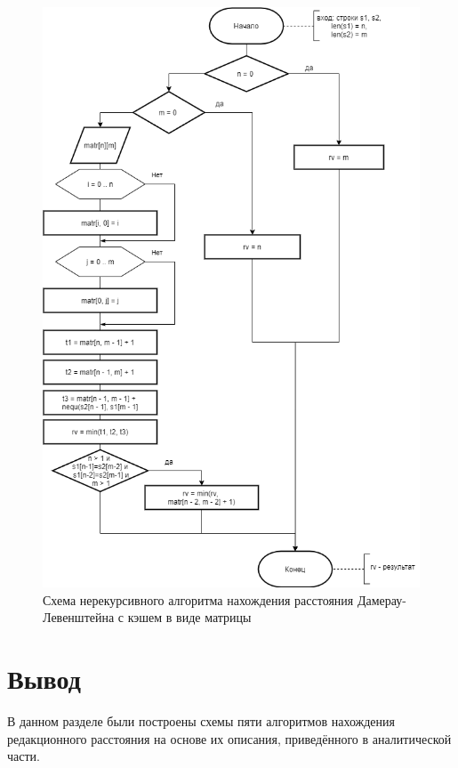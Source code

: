 \documentclass{report}
\begin{document}
\begin{figure}[h!p]\label{DamMatr}
	\centering
	\includegraphics[scale = 0.7]{DamLev.drawio.png}
	\caption{Схема нерекурсивного алгоритма нахождения расстояния Дамерау-Левенштейна с кэшем в виде матрицы}
	\label{fig:mpr5}
\end{figure}

\section{Вывод}

В данном разделе были построены схемы пяти алгоритмов нахождения редакционного расстояния на основе их описания, приведённого в аналитической части.

\newpage
\end{document}
